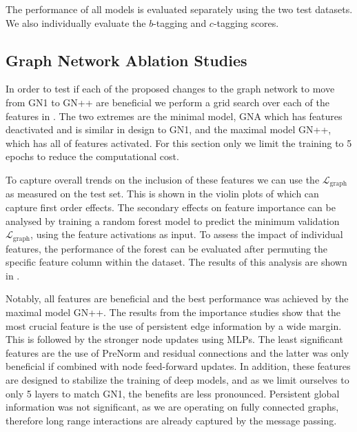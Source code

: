 The performance of all models is evaluated separately using the two test datasets.
We also individually evaluate the $b$-tagging and $c$-tagging scores.

\subsection{Graph Network Ablation Studies}

In order to test if each of the proposed changes to the graph network to move from GN1 to GN++ are beneficial we perform a grid search over each of the features in .
The two extremes are the minimal model, GNA which has features deactivated and is similar in design to GN1, and the maximal model GN++, which has all of features activated.
For this section only we limit the training to 5 epochs to reduce the computational cost.

To capture overall trends on the inclusion of these features we can use the $\mathcal{L}_{\text{graph}}$ as measured on the test set.
This is shown in the violin plots of  which can capture first order effects.
The secondary effects on feature importance can be analysed by training a random forest model to predict the minimum validation $\mathcal{L}_{\text{graph}}$, using the feature activations as input.
To assess the impact of individual features, the performance of the forest can be evaluated after permuting the specific feature column within the dataset.
The results of this analysis are shown in .

Notably, all features are beneficial and the best performance was achieved by the maximal model GN++.
The results from the importance studies show that the most crucial feature is the use of persistent edge information by a wide margin.
This is followed by the stronger node updates using MLPs.
The least significant features are the use of PreNorm and residual connections and the latter was only beneficial if combined with node feed-forward updates.
In addition, these features are designed to stabilize the training of deep models, and as we limit ourselves to only 5 layers to match GN1, the benefits are less pronounced.
Persistent global information was not significant, as we are operating on fully connected graphs, therefore long range interactions are already captured by the message passing.

